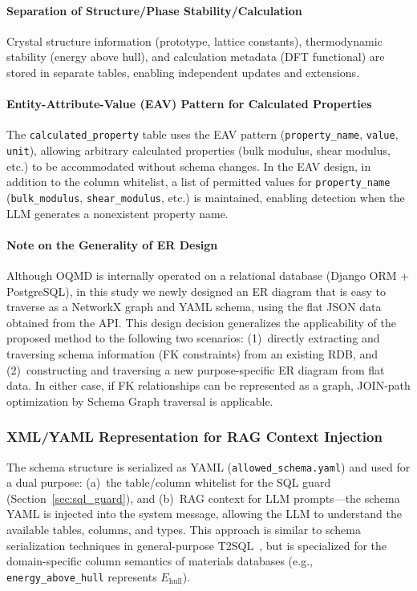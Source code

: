 \documentclass[5p,twocolumn]{elsarticle}
\begin{document}
\paragraph{Separation of Structure/Phase Stability/Calculation}
Crystal structure information (prototype, lattice constants), thermodynamic stability (energy above hull),
and calculation metadata (DFT functional) are stored in separate tables,
enabling independent updates and extensions.

\paragraph{Entity-Attribute-Value (EAV) Pattern for Calculated Properties}
The \texttt{calculated\_property} table uses the EAV pattern
(\texttt{property\_name}, \texttt{value}, \texttt{unit}),
allowing arbitrary calculated properties (bulk modulus, shear modulus, etc.) to be accommodated without schema changes.
In the EAV design, in addition to the column whitelist,
a list of permitted values for \texttt{property\_name} (\texttt{bulk\_modulus}, \texttt{shear\_modulus}, etc.)
is maintained, enabling detection when the LLM generates a nonexistent property name.

\paragraph{Note on the Generality of ER Design}
Although OQMD is internally operated on a relational database (Django ORM + PostgreSQL),
in this study we newly designed an ER diagram that is easy to traverse as a
NetworkX graph and YAML schema, using the flat JSON data obtained from the API.
This design decision generalizes the applicability of the proposed method to the following two scenarios:
(1)~directly extracting and traversing schema information (FK constraints) from an existing RDB,
and (2)~constructing and traversing a new purpose-specific ER diagram from flat data.
In either case, if FK relationships can be represented as a graph,
JOIN-path optimization by Schema Graph traversal is applicable.

\subsubsection{XML/YAML Representation for RAG Context Injection}

The schema structure is serialized as YAML (\texttt{allowed\_schema.yaml})
and used for a dual purpose:
(a)~the table/column whitelist for the SQL guard (Section~\ref{sec:sql_guard}),
and (b)~RAG context for LLM prompts---the schema YAML is injected into the system message,
allowing the LLM to understand the available tables, columns, and types.
This approach is similar to schema serialization techniques in general-purpose T2SQL~\citep{gao2023dail},
but is specialized for the domain-specific column semantics of materials databases
(e.g., \texttt{energy\_above\_hull} represents $E_\text{hull}$).
\end{document}
